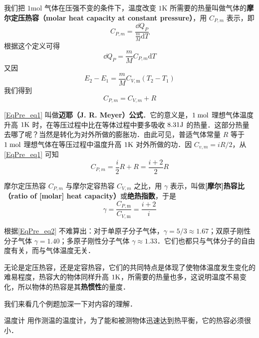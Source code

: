 我们把 $1\mathrm{mol}$ 气体在压强不变的条件下，温度改变 $1\mathrm K$ 所需要的热量叫做气体的\textbf{摩尔定压热容（molar heat capacity at constant pressure）}，用 $C_{P,m}$ 表示，即
\begin{equation}
C_{P, {m}}=\frac{\dd Q_{P}}{\frac{m}{M} \mathrm{d} T}
\end{equation}
根据这个定义可得
\begin{equation}
\dd Q_{P}=\frac{m}{M} C_{P, {m}} \mathrm{d} T
\end{equation}
又因
\begin{equation}
E_{2}-E_{1}=\frac{m}{M} C_{V, \mathrm{m}}\left(T_{2}-T_{1}\right)
\end{equation}
我们得到
\begin{equation} \label{EqPre_eq1}
C_{P, m}=C_{V, m}+R
\end{equation}

\autoref{EqPre_eq1} 叫做\textbf{迈耶（J. R. Meyer）公式}．它的意义是，$1\; \rm mol$ 理想气体温度升高 $1\rm K$ 时，在等压过程中比在等体过程中要多吸收 $8. 31\rm J $ 的热量．这部分热量去哪了呢？当然是转化为对外所做的膨胀功．由此可见，普适气体常量 $R$ 等于 $1\;\rm mol$ 理想气体在等压过程中温度升高 $1\rm K$ 对外所做的功．因 $C_{v, m}=iR/2$，从\autoref{EqPre_eq1} 可知
\begin{equation}
C_{P, {m}}=\frac{i}{2} R+R=\frac{i+2}{2} R
\end{equation}

摩尔定压热容 $C_{P,m}$ 与摩尔定容热容 $C_{V,m}$ 之比，用 $\gamma$ 表示，叫做\textbf{[摩尔]热容比（ratio of [molar] heat capacity）}或\textbf{绝热指数}，于是
\begin{equation} \label{EqPre_eq2}
\gamma=\frac{C_{P, \mathrm{m}}}{C_{V, \mathrm{m}}}=\frac{i+2}{i}
\end{equation}

根据\autoref{EqPre_eq2} 不难算出：对于单原子分子气体，$\gamma=5/3\approx 1.67$；双原子刚性分子气体 $\gamma=1.40$；多原子刚性分子气体 $\gamma\approx 1. 33 $．它们也都只与气体分子的自由度有关，而与气体温度无关．

无论是定压热容，还是定容热容，它们的共同特点是体现了使物体温度发生变化的难易程度，热容大的物体同样升高 $1\rm K$，所需要的热量也多，这说明温度不易变化，所以物体的热容是其\textbf{热惯性}的量度．

我们来看几个例题加深一下对内容的理解．

\begin{example}{温度计}
用作测温的温度计，为了能和被测物体迅速达到热平衡，它的热容必须很小．
\end{example}

